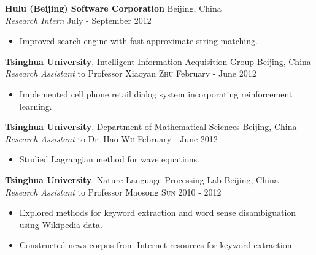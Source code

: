 \documentclass[a4paper,11pt]{article} %
\begin{document}

\textbf{Hulu (Beijing) Software Corporation} \hfill Beijing, China \\
\textit{Research Intern} \hfill July - September 2012
\vspace{-\parskip}
\begin{itemize}
  \item Improved search engine with fast approximate string matching.
\end{itemize}



\textbf{Tsinghua University}, Intelligent Information Acquisition Group \hfill Beijing, China \\
\textit{Research Assistant} to Professor Xiaoyan \textsc{Zhu} \hfill February - June 2012
\vspace{-\parskip}
\begin{itemize}
  \item Implemented cell phone retail dialog system incorporating reinforcement learning.
\end{itemize}


\textbf{Tsinghua University}, Department of Mathematical Sciences \hfill Beijing, China \\
\textit{Research Assistant} to Dr. Hao \textsc{Wu} \hfill February - June 2012
\vspace{-\parskip}
\begin{itemize}
  \item Studied Lagrangian method for wave equations.
\end{itemize}


\textbf{Tsinghua University}, Nature Language Processing Lab \hfill Beijing, China \\
\textit{Research Assistant} to Professor Maosong \textsc{Sun} \hfill 2010 - 2012
\vspace{-\parskip}
\begin{itemize}
  \item Explored methods for keyword extraction and word sense disambiguation using Wikipedia data.
  \item Constructed news corpus from Internet resources for keyword extraction.
\end{itemize}
\end{document}
